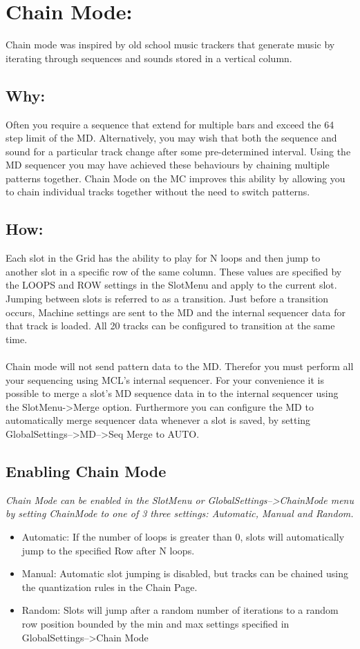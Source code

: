 \chapter{Chain Mode:}
Chain mode was inspired by old school music trackers that generate music by iterating through sequences and sounds stored in a vertical column.
\section{Why:}
Often you require a sequence that extend for multiple bars and exceed the 64 step limit of the MD. Alternatively, you may wish that both the sequence and sound for a particular track change after some pre-determined interval. Using the MD sequencer you may have achieved these behaviours by chaining multiple patterns together. Chain Mode on the MC improves this ability by allowing you to chain individual tracks together without the need to switch patterns.
\section{How:}
Each slot in the Grid has the ability to play for N loops and then jump to another slot in a specific row of the same column.  These values are specified by the LOOPS and ROW settings in the SlotMenu and apply to the current slot. Jumping between slots is referred to as a transition. Just before a transition occurs, Machine settings are sent to the MD and the internal sequencer data for that track is loaded. All 20 tracks can be configured to transition at the same time.\\
 \\
Chain mode will not send pattern data to the MD. Therefor you must perform all your sequencing using MCL's internal sequencer. For your convenience it is possible to merge a slot's MD sequence data in to the internal sequencer using the SlotMenu->Merge option. Furthermore you can configure the MD to automatically merge sequencer data whenever a slot is saved, by setting GlobalSettings-->MD-->Seq Merge to AUTO.
\section{Enabling Chain Mode}
\textit{ Chain Mode can be enabled in the SlotMenu or GlobalSettings-->ChainMode menu by setting ChainMode to one of 3 three settings: Automatic, Manual and Random.}

\begin{itemize}
	\item Automatic: If the number of loops is greater than 0, slots will automatically jump to the specified Row after N loops.
	\item Manual: Automatic slot jumping is disabled, but tracks can be chained using the quantization rules in the Chain Page.
	\item Random: Slots will jump after a random number of iterations to a random row position bounded by the min and max settings specified in GlobalSettings-->Chain Mode
\end{itemize}


